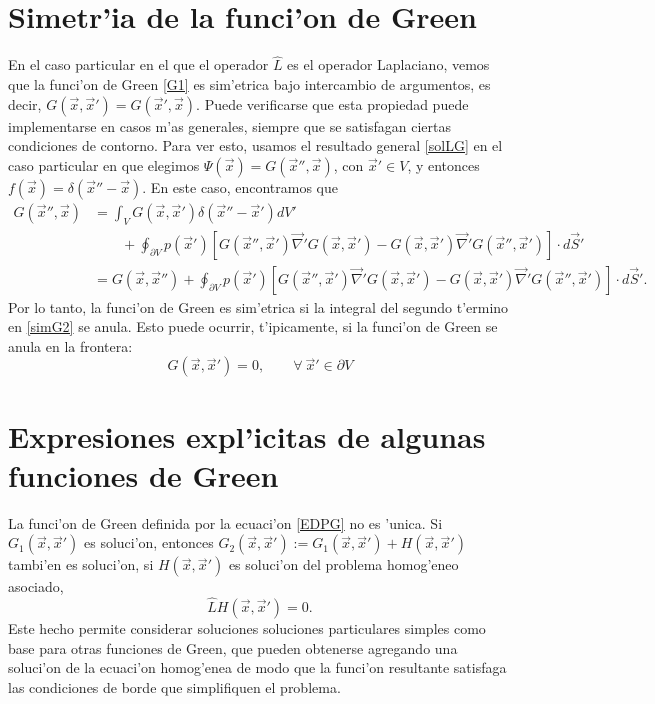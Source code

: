 \section{Simetr'ia de la funci'on de Green}
En el caso particular en el que el operador $\hat{L}$ es el operador Laplaciano, vemos que la  funci'on de Green \eqref{G1} es sim'etrica bajo intercambio de argumentos, es decir, $G(\vec{x},\vec{x}')=G(\vec{x}',\vec{x})$. Puede verificarse que esta propiedad puede implementarse en casos m'as generales, siempre que se satisfagan ciertas condiciones de contorno. Para ver esto, usamos el resultado general \eqref{solLG} en el caso particular en que elegimos $\Psi(\vec{x})=G(\vec{x}'',\vec{x})$, con $\vec{x}'\in V$, y entonces $f(\vec{x})=\delta(\vec{x}''-\vec{x})$. En este caso, encontramos que
\begin{align}\label{simG}
G(\vec{x}'',\vec{x}) &= \int_VG(\vec{x},\vec{x}')\delta(\vec{x}''-\vec{x}')dV' \nonumber\\
& \qquad +\oint_{\partial V}p(\vec{x}')\left[G(\vec{x}'',\vec{x}')\vec\nabla' G(\vec{x},\vec{x}') -G(\vec{x},\vec{x}')\vec\nabla'G(\vec{x}'',\vec{x}')\right]\cdot d\vec{S}' \\
&= G(\vec{x},\vec{x}'')+\oint_{\partial V}p(\vec{x}')\left[G(\vec{x}'',\vec{x}')\vec\nabla' G(\vec{x},\vec{x}')-G(\vec{x},\vec{x}')\vec\nabla'G(\vec{x}'',\vec{x}')\right]\cdot d\vec{S}'. \label{simG2}
\end{align}
Por lo tanto, la funci'on de Green es sim'etrica si la integral del segundo t'ermino en \eqref{simG2} se anula. Esto puede ocurrir, t'ipicamente, si la funci'on de Green se anula en la frontera:
\begin{equation}
G(\vec{x},\vec{x}')=0, \qquad \forall\ \vec{x}'\in\partial V
\end{equation}

\section{Expresiones expl'icitas de algunas funciones de Green}
La funci'on de Green definida por la ecuaci'on \eqref{EDPG} no es 'unica. Si $G_1(\vec{x},\vec{x}')$ es soluci'on, entonces $G_2(\vec{x},\vec{x}'):=G_1(\vec{x},\vec{x}')+H(\vec{x},\vec{x}')$ tambi'en es soluci'on, si $H(\vec{x},\vec{x}')$ es soluci'on del problema homog'eneo asociado, 
\begin{equation}
\hat{L}H(\vec{x},\vec{x}')=0.
\end{equation}
Este hecho permite considerar soluciones soluciones particulares simples como base para otras funciones de Green, que pueden obtenerse agregando una soluci'on de la ecuaci'on homog'enea de modo que la funci'on resultante satisfaga las condiciones de borde que simplifiquen el problema.

